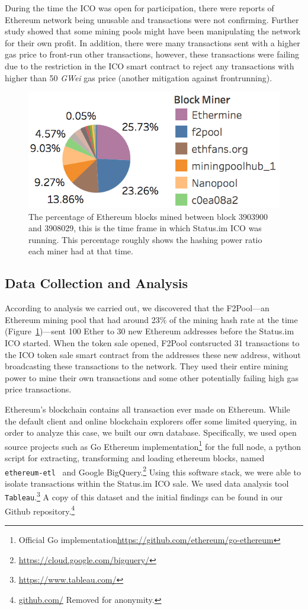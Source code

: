 During the time the ICO was open for participation, there were reports of Ethereum network being unusable and transactions were not confirming. Further study showed that some mining pools might have been manipulating the network for their own profit. In addition, there were many transactions sent with a higher gas price to front-run other transactions, however, these transactions were failing due to the restriction in the ICO smart contract to reject any transactions with higher than 50 \textit{GWei} gas price (another mitigation against frontrunning).

\begin{figure}[t]
\centering
\includegraphics[width=0.5\linewidth]{figures/Mining_pool_ratio.png}
\caption{\scriptsize The percentage of Ethereum blocks mined between block 3903900 and 3908029, this is the time frame in which Status.im ICO was running. This percentage roughly shows the hashing power ratio each miner had at that time. \label{fig:mining_pool_ratio}} %
\end{figure}

\subsection{Data Collection and Analysis}
According to analysis we carried out, we discovered that the F2Pool---an Ethereum mining pool that had around 23\% of the mining hash rate at the time (Figure~\ref{fig:mining_pool_ratio})---sent 100 Ether to 30 new Ethereum addresses before the Status.im ICO started. When the token sale opened, F2Pool contsructed 31 transactions to the ICO token sale smart contract from the addresses these new address, without broadcasting these transactions to the network. They used their entire mining power to mine their own transactions and some other potentially failing high gas price transactions.

Ethereum's blockchain contains all transaction ever made on Ethereum. While the default client and online blockchain explorers offer some limited querying, in order to analyze this case, we built our own database. Specifically, we used open source projects such as Go Ethereum implementation\footnote{Official Go implementation\url{https://github.com/ethereum/go-ethereum}} for the full node, a python script for extracting, transforming and loading ethereum blocks, named \texttt{ethereum-etl}~\cite{ethereumetl} and Google BigQuery.\footnote{\url{https://cloud.google.com/bigquery/}} Using this software stack, we were able to isolate transactions within the Status.im ICO sale. We used data analysis tool \texttt{Tableau}.\footnote{\url{https://www.tableau.com/}} A copy of this dataset and the initial findings can be found in our Github repository.\footnote{\url{github.com/} Removed for anonymity.}

